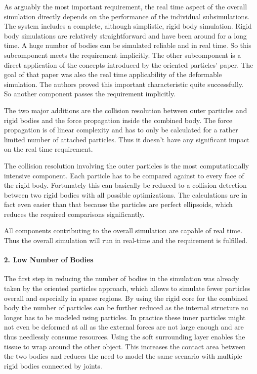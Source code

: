 As arguably the most important requirement, the real time aspect of the overall simulation directly depends on the performance of the individual subsimulations. The system includes a complete, although simplistic, rigid body simulation. Rigid body simulations are relatively straightforward and have been around for a long time. A huge number of bodies can be simulated reliable and in real time. So this subcomponent meets the requirement implicitly. The other subcomponent is a direct application of the concepts introduced by the oriented particles' paper. The goal of that paper was also the real time applicability of the deformable simulation. The authors proved this important characteristic quite successfully. So another component passes the requirement implicitly. 

The two major additions are the collision resolution between outer particles and rigid bodies and the force propagation inside the combined body. The force propagation is of linear complexity and has to only be calculated for a rather limited number of attached particles. Thus it doesn't have any significant impact on the real time requirement.

The collision resolution involving the outer particles is the most computationally intensive component. Each particle has to be compared against to every face of the rigid body. Fortunately this can basically be reduced to a collision detection between two rigid bodies with all possible optimizations. The calculations are in fact even easier than that because the particles are perfect ellipsoids, which reduces the required comparisons significantly.

All components contributing to the overall simulation are capable of real time. Thus the overall simulation will run in real-time and the requirement is fulfilled.

\paragraph{2. Low Number of Bodies}

The first step in reducing the number of bodies in the simulation was already taken by the oriented particles approach, which allows to simulate fewer particles overall and especially in sparse regions. By using the rigid core for the combined body the number of particles can be further reduced as the internal structure no longer has to be modeled using particles. In practice these inner particles might not even be deformed at all as the external forces are not large enough and are thus needlessly consume resources. Using the soft surrounding layer enables the tissue to wrap around the other object. This increases the contact area between the two bodies and reduces the need to model the same scenario with multiple rigid bodies connected by joints.

